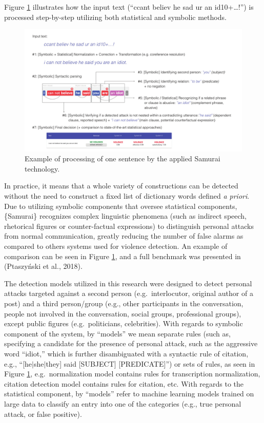 \documentclass[10pt,]{scrartcl}
\begin{document}
Figure \ref{fig:samuraiexample} illustrates how the input text (``ccant
believ he sad ur an id10+\ldots{}!'') is processed step-by-step
utilizing both statistical and symbolic methods.

\begin{figure}[h]
    \includegraphics[width=\linewidth]{../images/example-eps-converted-to.pdf}
    \caption{Example of processing of one sentence by the applied Samurai technology.}
    \label{fig:samuraiexample}
\end{figure}

In practice, it means that a whole variety of constructions can be
detected without the need to construct a fixed list of dictionary words
defined \textit{a priori}. Due to utilizing symbolic components that
oversee statistical components, \{\textsf Samurai\} recognizes complex
linguistic phenomena (such as indirect speech, rhetorical figures or
counter-factual expressions) to distinguish personal attacks from normal
communication, greatly reducing the number of false alarms as compared
to others systems used for violence detection. An example of comparison
can be seen in Figure \ref{fig:samuraiexample}, and a full benchmark was
presented in (Ptaszyński et al., 2018).

The detection models utilized in this research were designed to detect
personal attacks targeted against a second person (e.g.~interlocutor,
original author of a post) and a third person/group (e.g., other
participants in the conversation, people not involved in the
conversation, social groups, professional groups), except public figures
(e.g.~politicians, celebrities). With regards to symbolic component of
the system, by ``models'' we mean separate rules (such as, specifying a
candidate for the presence of personal attack, such as the aggressive
word ``idiot,'' which is further disambiguated with a syntactic rule of
citation, e.g., ``{[}he\(\vert\)she\(\vert\)they{]} said {[}SUBJECT{]}
{[}PREDICATE{]}'') or sets of rules, as seen in Figure
\ref{fig:samuraiexample}, e.g.~normalization model contains rules for
transcription normalization, citation detection model contains rules for
citation, etc. With regards to the statistical component, by ``models''
refer to machine learning models trained on large data to classify an
entry into one of the categories (e.g., true personal attack, or false
positive).
\end{document}
